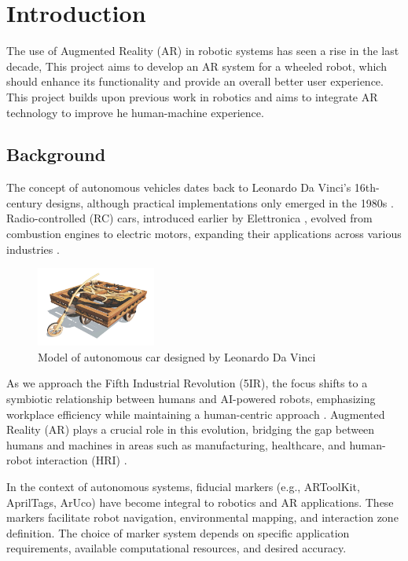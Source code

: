 \chapter{\label{ch:intro} Introduction}

The use of Augmented Reality (AR) in robotic systems has seen a rise in the last decade, This project aims to develop an AR system for a wheeled robot, which should enhance its functionality and provide an overall better user experience. This project builds upon previous work in robotics and aims to integrate AR technology to improve he human-machine experience.

\section{\label{sec:backg}Background}
The concept of autonomous vehicles dates back to Leonardo Da Vinci's 16th-century designs, although practical implementations only emerged in the 1980s \cite{Mobileye2023}. Radio-controlled (RC) cars, introduced earlier by Elettronica \cite{RC_Crush2023}, evolved from combustion engines to electric motors, expanding their applications across various industries \cite{GoogleBooks2017}.

\begin{figure}[h]
\centering
\includegraphics[width=0.35\textwidth]{ch1/figs/Vinci_car.jpg}
\caption{Model of autonomous car designed by Leonardo Da Vinci}
\label{fig:davinci_car}
\end{figure}

As we approach the Fifth Industrial Revolution (5IR), the focus shifts to a symbiotic relationship between humans and AI-powered robots, emphasizing workplace efficiency while maintaining a human-centric approach \cite{Samuels2023}. Augmented Reality (AR) plays a crucial role in this evolution, bridging the gap between humans and machines in areas such as manufacturing, healthcare, and human-robot interaction (HRI) \cite{Dalle2021}.

In the context of autonomous systems, fiducial markers (e.g., ARToolKit, AprilTags, ArUco) have become integral to robotics and AR applications. These markers facilitate robot navigation, environmental mapping, and interaction zone definition. The choice of marker system depends on specific application requirements, available computational resources, and desired accuracy.

